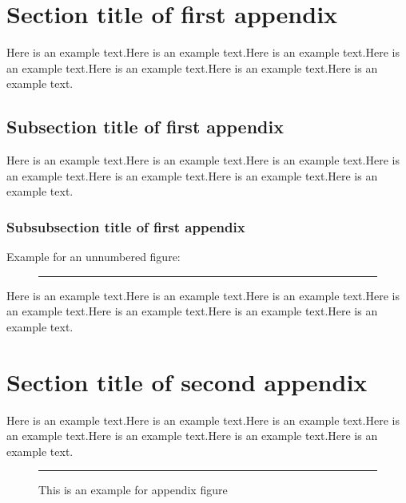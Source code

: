 \documentclass[namedate,webpdf,contemporary,large]{TBench-template}%
\theoremstyle{thmstyleone}%
\theoremstyle{thmstyletwo}%
\theoremstyle{thmstylethree}%
\begin{document}
\begin{appendices}

\section{Section title of first appendix}\label{sec11}

Here is an example text.Here is an example text.Here is an example text.Here is an example text.Here is an example text.Here is an example text.Here is an example text.

\subsection{Subsection title of first appendix}\label{subsec4}

Here is an example text.Here is an example text.Here is an example text.Here is an example text.Here is an example text.Here is an example text.Here is an example text.

\subsubsection{Subsubsection title of first appendix}\label{subsubsec3}

Example for an unnumbered figure:

\begin{figure}[!h]
\centering
{\color{black!20}\rule{85pt}{92pt}}
\end{figure}

Here is an example text.Here is an example text.Here is an example text.Here is an example text.Here is an example text.Here is an example text.Here is an example text.

\section{Section title of second appendix}\label{sec12}%

Here is an example text.Here is an example text.Here is an example text.Here is an example text.Here is an example text.Here is an example text.Here is an example text.

\begin{figure}[b]
\centering
{\color{black!20}\rule{217pt}{120pt}}
\caption{This is an example for appendix figure\label{fig4}}
\end{figure}


\end{appendices}
\end{document}
